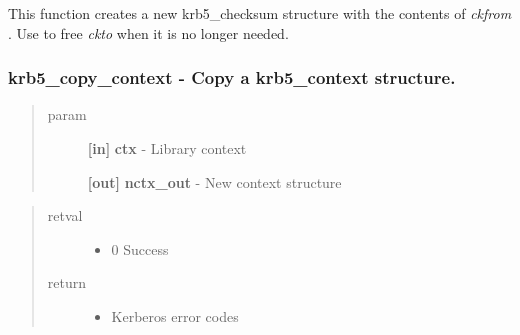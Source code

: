 \documentclass[letterpaper,10pt,english]{sphinxmanual}
\begin{document}
This function creates a new krb5\_checksum structure with the contents of \emph{ckfrom} . Use {\hyperref[appdev/refs/api/krb5_free_checksum:krb5_free_checksum]{}} to free \emph{ckto} when it is no longer needed.


\subsubsection{krb5\_copy\_context -  Copy a krb5\_context structure.}
\label{appdev/refs/api/krb5_copy_context:krb5-copy-context-copy-a-krb5-context-structure}\label{appdev/refs/api/krb5_copy_context::doc}

\begin{fulllineitems}
\label{appdev/refs/api/krb5_copy_context:krb5_copy_context}
\end{fulllineitems}

\begin{quote}\begin{description}
\item[{param}] \leavevmode
\textbf{{[}in{]}} \textbf{ctx} - Library context

\textbf{{[}out{]}} \textbf{nctx\_out} - New context structure

\end{description}\end{quote}
\begin{quote}\begin{description}
\item[{retval}] \leavevmode\begin{itemize}
\item {} 
0   Success

\end{itemize}

\item[{return}] \leavevmode\begin{itemize}
\item {} 
Kerberos error codes

\end{itemize}

\end{description}\end{quote}
\end{document}
